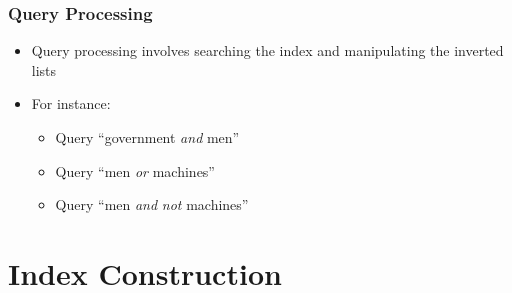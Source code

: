 \documentclass[svgnames]{beamer}
\begin{document}
\begin{frame}
    \frametitle{Query Processing}
    
    \begin{block}{}
        \begin{itemize}
        \item<+-> Query processing involves searching the index and manipulating
            the inverted lists
        \item<+-> For instance:
            \begin{itemize}
            \item<+-> Query ``government \emph{and} men'' 
            \item<+-> Query ``men \emph{or} machines'' 
            \item<+-> Query ``men \emph{and} \emph{not} machines'' 
            \end{itemize}
        \end{itemize}
    \end{block}

\end{frame}


\section{Index Construction}
\end{document}
